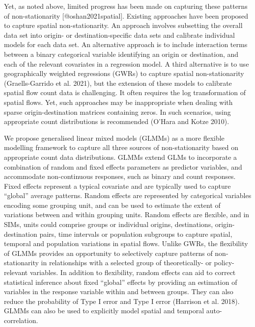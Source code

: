\documentclass[11pt,letterpaper]{article}
\begin{document}
Yet, as noted above, limited progress has been made on capturing these patterns of non-stationarity {[}@oshan2021spatial{]}.
Existing approaches have been proposed to capture spatial non-stationarity.
An approach involves subsetting the overall data set into origin- or destination-specific data sets and calibrate individual models for each data set.
An alternative approach is to include interaction terms between a binary categorical variable identifying an origin or destination, and each of the relevant covariates in a regression model.
A third alternative is to use geographically weighted regressions (GWRs) to capture spatial non-stationarity (Graells-Garrido et al. 2021), but the extension of these models to calibrate spatial flow count data is challenging.
It often requires the log transformation of spatial flows.
Yet, such approaches may be inappropriate when dealing with sparse origin-destination matrices containing zeros.
In such scenarios, using appropriate count distributions is recommended (O'Hara and Kotze 2010).

We propose generalised linear mixed models (GLMMs) as a more flexible modelling framework to capture all three sources of non-stationarity based on appropriate count data distributions.
GLMMs extend GLMs to incorporate a combination of random and fixed effects parameters as predictor variables, and accommodate non-continuous responses, such as binary and count responses.
Fixed effects represent a typical covariate and are typically used to capture ``global'' average patterns.
Random effects are represented by categorical variables encoding some grouping unit, and can be used to estimate the extent of variations between and within grouping units.
Random effects are flexible, and in SIMs, units could comprise groups or individual origins, destinations, origin-destination pairs, time intervals or population subgroups to capture spatial, temporal and population variations in spatial flows.
Unlike GWRs, the flexibility of GLMMs provides an opportunity to selectively capture patterns of non-stationarity in relationships with a selected group of theoretically- or policy-relevant variables.
In addition to flexibility, random effects can aid to correct statistical inference about fixed ``global'' effects by providing an estimation of variables in the response variable within and between groups.
They can also reduce the probability of Type I error and Type I error (Harrison et al. 2018).
GLMMs can also be used to explicitly model spatial and temporal auto-correlation.
\end{document}

